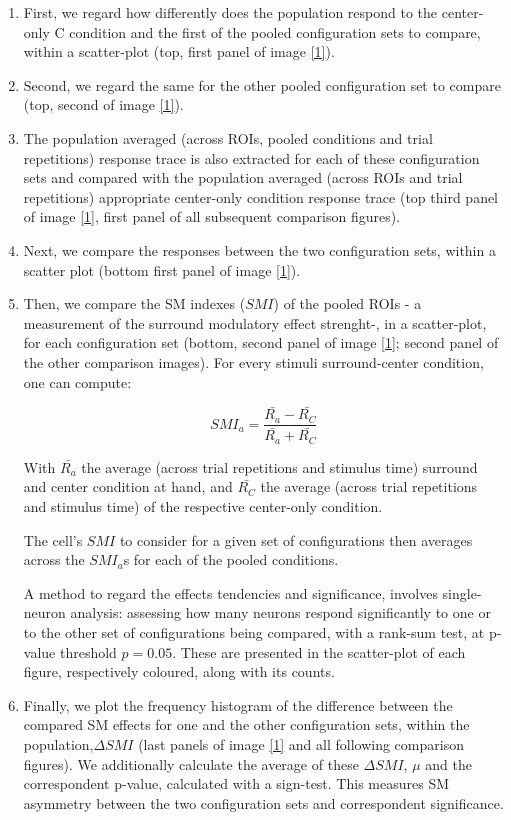 \begin{enumerate}
\item First, we regard how differently does the population respond to the center-only C condition and the first of the pooled configuration sets to compare, within a scatter-plot (top, first panel of image \ref{1}). 

\item Second, we regard the same for the other pooled configuration set to compare (top, second of image \ref{1}). 

\item The population averaged (across ROIs, pooled conditions and trial repetitions) response trace is also extracted for each of these configuration sets and compared with the population averaged (across ROIs and trial repetitions) appropriate center-only condition response trace (top third panel of image \ref{1}, first panel of all subsequent comparison figures).

\item Next, we compare the responses between the two configuration sets, within a scatter plot (bottom first panel of image \ref{1}).

\item Then, we compare the SM indexes ($SMI$) of the pooled ROIs - a measurement of the surround modulatory effect strenght-, in a scatter-plot, for each configuration set (bottom, second panel of image \ref{1}; second panel of the other comparison images). For every stimuli surround-center condition, one can compute:

\begin{equation}
SMI_a=\dfrac{\bar{R_{a}}-\bar{R_C}}{\bar{R_a}+\bar{R_C}}
\end{equation}

With $\bar{R_a}$ the average (across trial repetitions and stimulus time) surround and center condition at hand, and $\bar{R_C}$ the average  (across trial repetitions and stimulus time) of the respective center-only condition.

The cell's $SMI$ to consider for a given set of configurations then averages across the $SMI_a$s for each of the pooled conditions.

A method to regard the effects tendencies and significance, involves single-neuron analysis: assessing how many neurons respond significantly to one or to the other set of configurations being compared, with a rank-sum test, at p-value threshold $p=0.05$. These are presented in the scatter-plot of each figure, respectively coloured, along with its counts. 

\item Finally, we plot the frequency histogram of the difference between the compared SM effects for one and the other configuration sets, within the population,$\Delta SMI$ (last panels of image \ref{1} and all following comparison figures). We additionally calculate the average of these $\Delta SMI$, $\mu$ and the correspondent p-value, calculated with a sign-test. This measures SM asymmetry between the two configuration sets and correspondent significance.

\end{enumerate}

